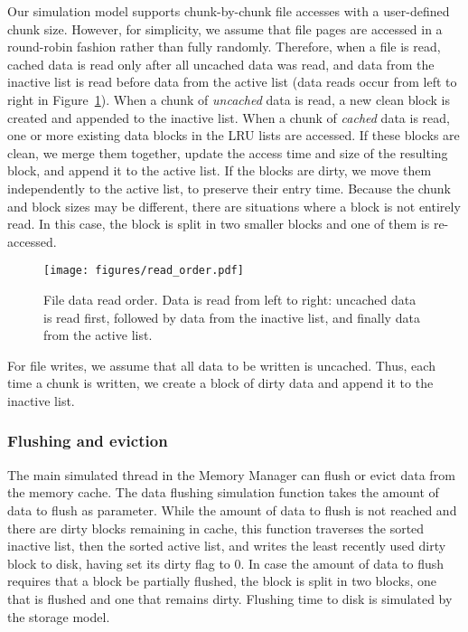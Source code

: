 \documentclass[conference]{IEEEtran}
\begin{document}
    Our simulation model supports chunk-by-chunk file accesses
    with a user-defined chunk size. However, for simplicity, we assume that file pages are 
    accessed in a round-robin fashion rather than fully randomly. 
    Therefore, when a file is read, cached data is read only after all uncached data was read, and data from the inactive list is read
    before data from the active list
    (data reads occur from left to right in Figure~\ref{fig:read_order}).
    When a chunk of \emph{uncached} data is read, a new clean block is created 
    and appended to the inactive list. 
    When a chunk of \emph{cached} data is read, one or more existing data blocks in the LRU lists are accessed.
    If these blocks are clean, we merge them together, update the access time and size of the resulting block, 
    and append it to the active list. 
    If the blocks are dirty, we move them independently to the active list, to preserve their entry time. 
    Because the chunk and block sizes may be different, there are situations
    where a block is not entirely read. 
    In this case, the block is split in two smaller blocks and one of them is re-accessed.
    \begin{figure}
           \centering
           \texttt{[image: figures/read\_order.pdf]}
           \caption{File data read order. Data is read from left to right: uncached data 
           is read first, followed by data from the inactive list, and finally data from the active list. }
           \label{fig:read_order}
    \end{figure}    

    For file writes, we assume that all data to be written is 
    uncached. Thus, each time a chunk is written, we create a block of dirty data 
    and append it to the inactive list.

    \subsubsection{Flushing and eviction}

    The main simulated thread in the Memory Manager can flush or evict data from the
    memory cache. The data flushing simulation
    function takes the amount of data to flush as parameter. While
    the amount of data to flush is not reached and there are dirty
    blocks remaining in cache, this function traverses the sorted
    inactive list, then the sorted active list, and writes the
    least recently used dirty block to disk, having set its dirty
    flag to 0. In case the amount of data to flush requires that a
    block be partially flushed, the block is split in two blocks,
    one that is flushed and one that remains dirty. Flushing time
    to disk is simulated by the storage model.
\end{document}
